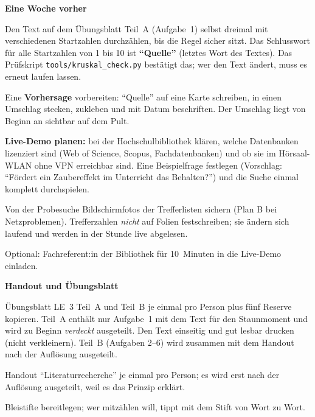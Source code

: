 \begin{vorbereitung}
\textbf{Eine Woche vorher}
\begin{checkliste}
  \item Den Text auf dem Übungsblatt Teil~A (Aufgabe~1) selbst dreimal mit
    verschiedenen Startzahlen durchzählen, bis die Regel sicher sitzt. Das
    Schlusswort für alle Startzahlen von 1 bis 10 ist \textbf{\enquote{Quelle}}
    (letztes Wort des Textes). Das Prüfskript
    \texttt{tools/kruskal\_check.py} bestätigt das; wer den Text ändert,
    muss es erneut laufen lassen.
  \item Eine \textbf{Vorhersage} vorbereiten: \enquote{Quelle} auf eine
    Karte schreiben, in einen Umschlag stecken, zukleben und mit Datum
    beschriften. Der Umschlag liegt von Beginn an sichtbar auf dem Pult.
  \item \textbf{Live-Demo planen:} bei der Hochschulbibliothek klären, welche
    Datenbanken lizenziert sind (Web of Science, Scopus, Fachdatenbanken)
    und ob sie im Hörsaal-WLAN ohne VPN erreichbar sind. Eine Beispielfrage
    festlegen (Vorschlag: \enquote{Fördert ein Zaubereffekt im Unterricht
    das Behalten?}) und die Suche einmal komplett durchspielen.
  \item Von der Probesuche Bildschirmfotos der Trefferlisten sichern (Plan B
    bei Netzproblemen). Trefferzahlen \emph{nicht} auf Folien festschreiben;
    sie ändern sich laufend und werden in der Stunde live abgelesen.
  \item Optional: Fachreferent:in der Bibliothek für 10~Minuten in die
    Live-Demo einladen.
\end{checkliste}

\textbf{Handout und Übungsblatt}
\begin{checkliste}
  \item Übungsblatt LE~3 Teil~A und Teil~B je einmal pro Person plus fünf
    Reserve kopieren. Teil~A enthält nur Aufgabe~1 mit dem Text für den
    Staunmoment und wird zu Beginn \emph{verdeckt} ausgeteilt. Den Text
    einseitig und gut lesbar drucken (nicht verkleinern). Teil~B
    (Aufgaben 2--6) wird zusammen mit dem Handout nach der Auflösung
    ausgeteilt.
  \item Handout \enquote{Literaturrecherche} je einmal pro Person; es wird
    erst nach der Auflösung ausgeteilt, weil es das Prinzip erklärt.
  \item Bleistifte bereitlegen; wer mitzählen will, tippt mit dem Stift von
    Wort zu Wort.
\end{checkliste}


\end{vorbereitung}
